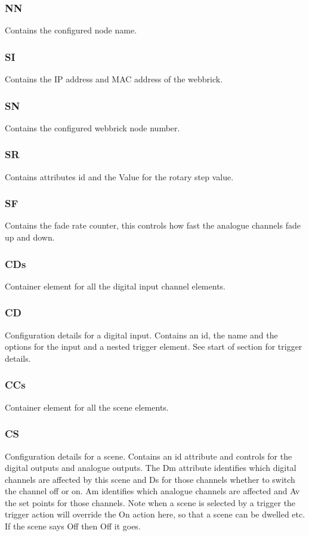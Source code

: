 \subsubsection {NN}
Contains the configured node name.

\subsubsection {SI}
Contains the IP address and MAC address of the webbrick.

\subsubsection {SN}
Contains the configured webbrick node number.

\subsubsection {SR}
Contains attributes id and the Value for the rotary step value.

\subsubsection {SF}
Contains the fade rate counter, this controls how fast the analogue channels fade up and down.

\subsubsection {CDs}
Container element for all the digital input channel elements.

\subsubsection {CD}
Configuration details for a digital input. Contains an id, the name and the options for the input and a nested trigger
element. See start of section for trigger details.

\subsubsection {CCs}
Container element for all the scene elements.

\subsubsection {CS}
Configuration details for a scene. Contains an id attribute and controls for the digital outputs and analogue outputs.
The Dm attribute identifies which digital channels are affected by this scene and Ds for those channels whether to 
switch the channel off or on. Am identifies which analogue channels are affected and Av the set points for those 
channels. Note when a scene is selected by a trigger the trigger action will override the On action here, so that 
a scene can be dwelled etc. If the scene says Off then Off it goes.


